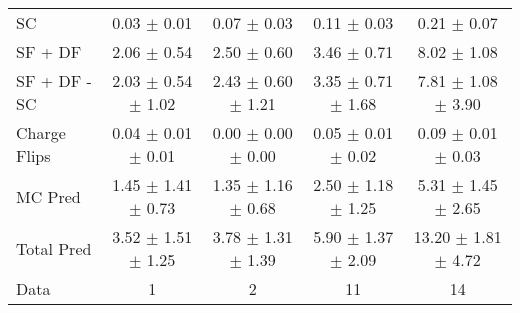 \begin{tabular}{l|cccc}
                                 SC &  0.03 $\pm$  0.01 &  0.07 $\pm$  0.03 &  0.11 $\pm$  0.03 &  0.21 $\pm$  0.07 \\
                            SF + DF &  2.06 $\pm$  0.54 &  2.50 $\pm$  0.60 &  3.46 $\pm$  0.71 &  8.02 $\pm$  1.08 \\
\hline
                       SF + DF - SC &  2.03 $\pm$  0.54 $\pm$  1.02 &  2.43 $\pm$  0.60 $\pm$  1.21 &  3.35 $\pm$  0.71 $\pm$  1.68 &  7.81 $\pm$  1.08 $\pm$  3.90 \\
\hline\hline
                       Charge Flips &  0.04 $\pm$  0.01 $\pm$  0.01 &  0.00 $\pm$  0.00 $\pm$  0.00 &  0.05 $\pm$  0.01 $\pm$  0.02 &  0.09 $\pm$  0.01 $\pm$  0.03 \\
\hline
                            MC Pred &  1.45 $\pm$  1.41 $\pm$  0.73 &  1.35 $\pm$  1.16 $\pm$  0.68 &  2.50 $\pm$  1.18 $\pm$  1.25 &  5.31 $\pm$  1.45 $\pm$  2.65 \\
\hline
                         Total Pred &  3.52 $\pm$  1.51 $\pm$  1.25 &  3.78 $\pm$  1.31 $\pm$  1.39 &  5.90 $\pm$  1.37 $\pm$  2.09 & 13.20 $\pm$  1.81 $\pm$  4.72 \\
\hline\hline
                               Data &     1 &     2 &    11 &    14 \\
\hline\hline
\end{tabular}

